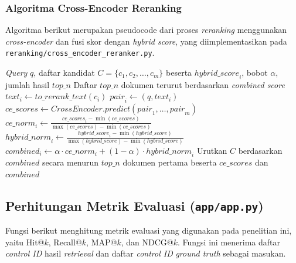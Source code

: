 \subsubsection{Algoritma Cross-Encoder Reranking}

Algoritma berikut merupakan pseudocode dari proses \textit{reranking} menggunakan \textit{cross-encoder} dan fusi skor dengan \textit{hybrid score}, yang diimplementasikan pada \texttt{reranking/cross\_encoder\_reranker.py}.

\begin{algorithm}[H]
\caption{Cross-Encoder Reranking with Score Fusion}
\label{alg:cross_encoder_reranking}
\begin{algorithmic}[1]
\Require \textit{Query} $q$, daftar kandidat $C = \{c_1, c_2, \ldots, c_m\}$ beserta $\mathit{hybrid\_score}_i$, bobot $\alpha$, jumlah hasil $\mathit{top\_n}$
\Ensure Daftar $\mathit{top\_n}$ dokumen terurut berdasarkan \textit{combined score}
    \State $\mathit{text}_i \gets \mathit{to\_rerank\_text}(c_i)$ 
    \State $\mathit{pair}_i \gets (q, \mathit{text}_i)$
\EndFor
\State $\mathit{ce\_scores} \gets \mathit{CrossEncoder}.\mathit{predict}(\mathit{pair}_1, \ldots, \mathit{pair}_m)$
\State $\mathit{ce\_norm}_i \gets \frac{\mathit{ce\_scores}_i - \min(\mathit{ce\_scores})}{\max(\mathit{ce\_scores}) - \min(\mathit{ce\_scores})}$ 
\State $\mathit{hybrid\_norm}_i \gets \frac{\mathit{hybrid\_score}_i - \min(\mathit{hybrid\_score})}{\max(\mathit{hybrid\_score}) - \min(\mathit{hybrid\_score})}$
    \State $\mathit{combined}_i \gets \alpha \cdot \mathit{ce\_norm}_i + (1 - \alpha) \cdot \mathit{hybrid\_norm}_i$
\EndFor
\State Urutkan $C$ berdasarkan $\mathit{combined}$ secara menurun
\State \Return $\mathit{top\_n}$ dokumen pertama beserta $\mathit{ce\_scores}$ dan $\mathit{combined}$
\end{algorithmic}
\end{algorithm}

\subsection{Perhitungan Metrik Evaluasi (\texttt{app/app.py})}

Fungsi berikut menghitung metrik evaluasi yang digunakan pada penelitian ini, yaitu Hit@$k$, Recall@$k$, MAP@$k$, dan NDCG@$k$. Fungsi ini menerima daftar \textit{control ID} hasil \textit{retrieval} dan daftar \textit{control ID} \textit{ground truth} sebagai masukan.

